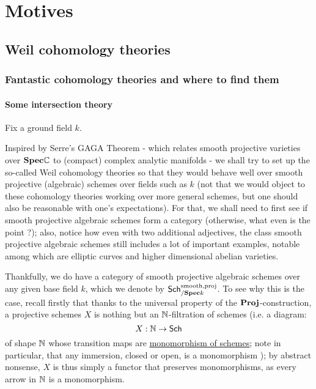 \chapter{Motives}
    \begin{abstract}
        
    \end{abstract}
    
    \minitoc
    
    \section{Weil cohomology theories}
        \subsection{Fantastic cohomology theories and where to find them}
            \subsubsection{Some intersection theory}
                \begin{remark} \label{remark: categories_of_smooth_projective_schemes}
                    Fix a ground field $k$. 
                    
                    Inspired by Serre's GAGA Theorem - which relates smooth projective varieties over $\mathbf{Spec} \mathbb{C}$ to (compact) complex analytic manifolds - we shall try to set up the so-called Weil cohomology theories so that they would behave well over smooth projective (algebraic) schemes over fields such as $k$ (not that we would object to these cohomology theories working over more general schemes, but one should also be reasonable with one's expectations). For that, we shall need to first see if smooth projective algebraic schemes form a category (otherwise, what even is the point ?); also, notice how even with two additional adjectives, the class smooth projective algebraic schemes still includes a lot of important examples, notable among which are elliptic curves and higher dimensional abelian varieties.
                    
                    Thankfully, we do have a category of smooth projective algebraic schemes over any given base field $k$, which we denote by $\mathsf{Sch}_{/\mathbf{Spec} k}^{\mathrm{smooth}, \mathrm{proj}}$. To see why this is the case, recall firstly that thanks to the universal property of the $\mathbf{Proj}$-construction, a projective schemes $X$ is nothing but an $\mathbb{N}$-filtration of schemes (i.e. a diagram:
                        $$X: \mathbb{N} \to \mathsf{Sch}$$
                    of shape $\mathbb{N}$ whose transition maps are \href{https://stacks.math.columbia.edu/tag/01L1}{\underline{monomorphism of schemes}}; note in particular, that any immersion, closed or open, is a monomorphism \cite[\href{https://stacks.math.columbia.edu/tag/01L7}{Tag 01L7}]{stacks}); by abstract nonsense, $X$ is thus simply a functor that preserves monomorphisms, as every arrow in $\mathbb{N}$ is a monomorphism.  
                \end{remark}
                
